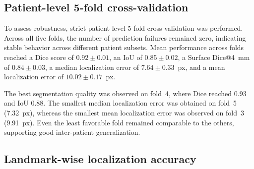 \documentclass[oneside,pdflatex,sn-mathphys-num]{sn-jnl}
\begin{document}
\subsection{Patient-level 5-fold cross-validation}\label{subsec:crossval}

To assess robustness, strict patient-level 5-fold cross-validation was performed. Across all five folds, the number of prediction failures remained zero, indicating stable behavior across different patient subsets. Mean performance across folds reached a Dice score of $0.92 \pm 0.01$, an IoU of $0.85 \pm 0.02$, a Surface Dice@4~mm of $0.84 \pm 0.03$, a median localization error of $7.64 \pm 0.33$~px, and a mean localization error of $10.02 \pm 0.17$~px.

The best segmentation quality was observed on fold~4, where Dice reached 0.93 and IoU 0.88. The smallest median localization error was obtained on fold~5 (7.32~px), whereas the smallest mean localization error was observed on fold~3 (9.91~px). Even the least favorable fold remained comparable to the others, supporting good inter-patient generalization.

\begin{table}[htbp]
\caption{Patient-level 5-fold cross-validation results for BAMNet}\label{tab:crossval}
\centering
{}
\end{table}

\subsection{Landmark-wise localization accuracy}\label{subsec:landmarkwise}
\end{document}
